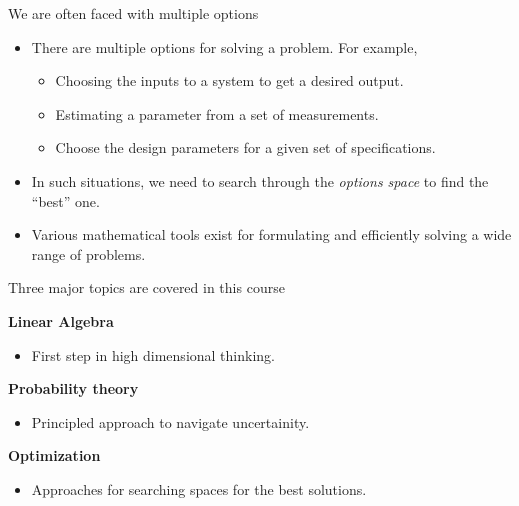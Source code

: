 \documentclass[aspectratio=169]{beamer}
\let\olditem\item
\renewcommand{\item}{\setlength{\itemsep}{\fill}\olditem}
\begin{document}
\begin{frame}{We are often faced with multiple options}
\begin{itemize}
  \item There are multiple options for solving a problem. For example,
  \begin{itemize}
    \item Choosing the inputs to a system to get a desired output. 
    \item Estimating a parameter from a set of measurements.
    \item Choose the design parameters for a given set of specifications.
  \end{itemize}
  \vspace{0.2cm}
  \item In such situations, we need to search through the \textit{options space} to find the ``best'' one.
  \vspace{0.2cm}
  \item Various mathematical tools exist for formulating and efficiently solving a wide range of problems.
\end{itemize}
\end{frame}

\begin{frame}{Three major topics are covered in this course}
  \begin{Large}
    {\textbf{Linear Algebra}}
  \end{Large}
  \begin{itemize}
    \item First step in high dimensional thinking.
  \end{itemize}
  \vspace{0.75cm}
  
  \begin{Large}
    {\textbf{Probability theory}}
  \end{Large}
  \begin{itemize}
    \item Principled approach to navigate uncertainity.
  \end{itemize}
  \vspace{0.75cm}
  
  \begin{Large}
    {\textbf{Optimization}}
  \end{Large}
  \begin{itemize}
    \item Approaches for searching spaces for the best solutions.
  \end{itemize}
\end{frame}
\end{document}
